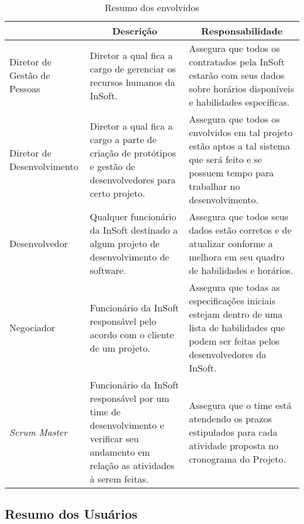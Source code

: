       \begin{table}[H]
        \centering
        \begin{tabular}{|p{}|p{}|p{}|}
          \hline
          \rowcolor[HTML]{C0C0C0}
          \multicolumn{1}{c}{Nome} & \multicolumn{1}{|c|}{Descrição} & \multicolumn{1}{|c|}{Responsabilidade} \\ \hline
            Diretor de Gestão de Pessoas & Diretor a qual fica a cargo de gerenciar os recursos humanos da InSoft.
                                         & Assegura que todos os contratados pela InSoft estarão com seus dados sobre horários disponíveis e habilidades específicas. \\ \hline
            Diretor de Desenvolvimento   & Diretor a qual fica a cargo a parte de criação de protótipos e gestão de desenvolvedores para certo projeto. & Assegura que todos os envolvidos em tal projeto estão aptos a tal sistema que será feito e se possuem tempo para trabalhar no desenvolvimento. \\ \hline
            Desenvolvedor                & Qualquer funcionário da InSoft destinado a algum projeto de desenvolvimento de software.                  & Assegura que todos seus dados estão corretos e de atualizar conforme a melhora em seu quadro de habilidades e horários. \\ \hline
            Negociador                   & Funcionário da InSoft responsável pelo acordo com o cliente de um projeto.
                                         & Assegura que todas as especificações iniciais estejam dentro de uma lista de habilidades que podem ser feitas pelos desenvolvedores da InSoft. \\ \hline
            \emph{Scrum Master}          & Funcionário da InSoft responsável por um time de desenvolvimento e verificar seu andamento em relação as atividades à serem feitas.
                                         & Assegura que o time está atendendo os prazos estipulados para cada atividade proposta no cronograma do Projeto. \\ \hline
        \end{tabular}
        \caption{Resumo dos envolvidos}
      \end{table}

    \subsection{Resumo dos Usuários}

